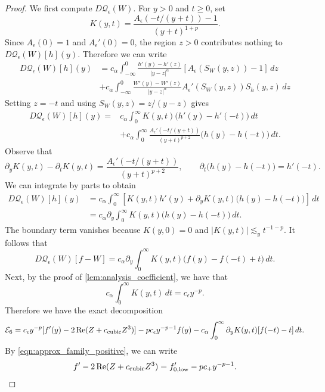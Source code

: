 \documentclass[11pt]{amsart}
\theoremstyle{definition}
\theoremstyle{remark}
\numberwithin{equation}{section}
\newcommand{\mc}[1]{\mathcal{#1}}
\begin{document}
\begin{proof}
    We first compute $D\mc{Q}_\epsilon(W)$. For $y>0$ and $t\geq0$, set
    \[K(y,t)=\frac{A_\epsilon(-t/(y+t))-1}{(y+t)^{1+p}}.\]
    Since $A_\epsilon(0)=1$ and $A_\epsilon'(0)=0$, the region $z>0$ contributes nothing to $D\mc{Q}_\epsilon(W)[h](y)$. Therefore we can write
    \begin{align*}
        D\mc{Q}_\epsilon(W)[h](y) & = c_\alpha\int_{-\infty}^{0}\frac{h'(y) - h'(z)}{|y - z|^\alpha}[A_\epsilon(S_W(y,z)) - 1] \, dz \\
        & + c_\alpha\int_{-\infty}^{0}\frac{W'(y) - W'(z)}{|y - z|^\alpha}A_\epsilon'(S_W(y,z))S_h(y,z) \, dz
    \end{align*}
    Setting $z=-t$ and using $S_{W}(y,z) = z / (y - z)$ gives
    \begin{align*}
        D\mc{Q}_\epsilon(W)[h](y)
        ={}&c_\alpha\int_0^\infty K(y,t)\bigl(h'(y)-h'(-t)\bigr)\,dt\\
        &+c_\alpha\int_0^\infty
        \frac{A_\epsilon'(-t/(y+t))}{(y+t)^{p+2}}
        \bigl(h(y)-h(-t)\bigr)\,dt.
    \end{align*}
    Observe that
    \[\partial_yK(y,t)-\partial_tK(y,t)
      =\frac{A_\epsilon'(-t/(y+t))}{(y+t)^{p+2}},\qquad
      \partial_t\bigl(h(y)-h(-t)\bigr)=h'(-t).\]
    We can integrate by parts to obtain
    \begin{equation}\label{eqn:approx_wedge_first_variation}
        \begin{aligned}
            D\mc{Q}_\epsilon(W)[h](y)
            &=c_\alpha\int_0^\infty
            \left[K(y,t)h'(y)+\partial_yK(y,t)\bigl(h(y)-h(-t)\bigr)\right]\,dt\\
            &=c_\alpha\partial_y\int_0^\infty
            K(y,t)\bigl(h(y)-h(-t)\bigr)\,dt.
        \end{aligned}
    \end{equation}
    The boundary term vanishes because $K(y, 0) = 0$ and $|K(y, t)| \lesssim_y t^{-1-p}$. It follows that 
    \[D\mc{Q}_\epsilon(W)[f - W] = c_\alpha\partial_y\int_0^\infty
            K(y,t)\bigl(f(y) - f(-t) + t\bigr)\,dt.\]
    Next, by the proof of \cref{lem:analysis_coefficient}, we have that 
    \[c_\alpha\int_{0}^{\infty}K(y, t) \, dt = c_\epsilon y^{-p}.\]
    Therefore we have the exact decomposition
    \[\mc{E}_6 = c_\epsilon y^{-p}[f'(y) - 2\, \text{Re}(Z + c_{\textup{cubic}}Z^3)] - pc_\epsilon y^{-p-1}f(y) - c_\alpha \int_{0}^{\infty}\partial_yK(y,t)[f(-t) - t] \, dt.\]
    By \eqref{eqn:approx_family_positive}, we can write 
    \[f' - 2\, \text{Re}(Z + c_{\textup{cubic}}Z^3) = f_{0, \textup{low}}' - pc_+ y^{-p-1}.\]

\end{proof}
\end{document}
